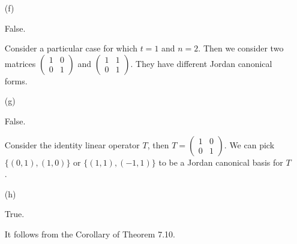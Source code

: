 \begin{Exercise}
\begin{enumerate}[(a)]
\item[(f)]
\begin{answer}
False.
\end{answer}
\begin{solution}
Consider a particular case for which $t = 1$ and $n = 2$. Then we consider two matrices $\begin{pmatrix}
1 & 0 \\
0 & 1
\end{pmatrix}$ and $\begin{pmatrix}
1 & 1 \\
0 & 1
\end{pmatrix}$. They have different Jordan canonical forms.
\end{solution}

\item[(g)]
\begin{answer}
False.
\end{answer}
\begin{solution}
Consider the identity linear operator $T$, then $T = \begin{pmatrix}
1 & 0 \\
0 & 1
\end{pmatrix}$. We can pick $\{(0,1),(1,0)\}$ or $\{(1,1),(-1,1)\}$ to be a Jordan canonical basis for $T$.
\end{solution}

\item[(h)]
\begin{answer}
True.
\end{answer}
\begin{solution}
It follows from the Corollary of Theorem 7.10.
\end{solution}

\end{enumerate}
\end{Exercise}